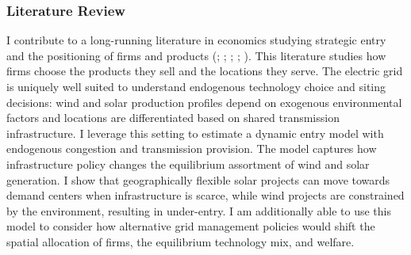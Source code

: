 \documentclass[12pt]{article}
\begin{document}

\subsubsection*{Literature Review}

I contribute to a long-running literature in economics studying strategic entry and the positioning of firms and products (\cite{Mazzeo2002}; \cite{Seim2006}; \cite{Jia2008}; \cite{Ryan2012}; \cite{Sweeting2013}). This literature studies how firms choose the products they sell and the locations they serve. The electric grid is uniquely well suited to understand endogenous technology choice and siting decisions: wind and solar production profiles depend on exogenous environmental factors and locations are differentiated based on shared transmission infrastructure. I leverage this setting to estimate a dynamic entry model with endogenous congestion and transmission provision. The model captures how infrastructure policy changes the equilibrium assortment of wind and solar generation. I show that geographically flexible solar projects can move towards demand centers when infrastructure is scarce, while wind projects are constrained by the environment, resulting in under-entry. I am additionally able to use this model to consider how alternative grid management policies would shift the spatial allocation of firms, the equilibrium technology mix, and welfare. 
\end{document}
